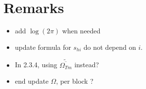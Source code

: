\documentclass[11pt,a4paper]{article}
\begin{document}
\section*{Remarks}
\begin{itemize}
\item add $\log(2\pi)$ when needed
\item update formula for $s_{hi}$ do not depend on $i$.
\item In 2.3.4, using $\widetilde{\overline{\Omega_{Tm}}}$ instead?
\item end update $\Omega$, per block ?
\end{itemize}

\newpage

\end{document}

